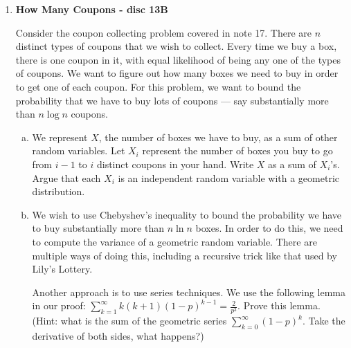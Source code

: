 \documentclass[11pt]{article}
\newif\ifsolutions
\begin{document}
\maketitle



\begin{enumerate}

\item {\bf How Many Coupons - disc 13B}

Consider the coupon collecting problem covered in note 17. There are
$n$ distinct types of coupons that we wish to collect. Every time we
buy a box, there is one coupon in it, with equal likelihood of being
any one of the types of coupons. We want to figure out how many boxes
we need to buy in order to get one of each coupon. For this problem,
we want to bound the probability that we have to buy lots of coupons
--- say substantially more than $n\log{n}$ coupons. 

\begin{enumerate}[a)]
\item We represent $X$, the number of boxes we have to buy, as a sum
  of other random variables. Let $X_i$ represent the number of boxes
  you buy to go from $i-1$ to $i$ distinct coupons in your hand. Write
  $X$ as a sum of $X_i$'s. Argue that each $X_i$ is an independent
  random variable with a geometric distribution. 

\ifsolutions{\color{blue}{
\[ X = \sum\nolimits_{i=1}^n X_i \quad\quad\quad \text{Each  } X_i \sim \text{Geo}\left(\frac{n-i+1}{n}\right) \]
}}\fi

\item We wish to use Chebyshev's inequality to bound the probability
  we have to buy substantially more than $n \ln{n}$ boxes. In order
  to do this, we need to compute the variance of a geometric random
  variable. There are multiple ways of doing this, including a
  recursive trick like that used by Lily's Lottery.

  Another approach is to use series techniques. We use the following
  lemma in our proof: 
  $\sum\nolimits_{k=1}^{\infty} k(k+1)(1-p)^{k-1} =
  \frac{2}{p^3}$. Prove this lemma. (Hint: what is the sum of the
  geometric series $\sum\nolimits_{k=0}^{\infty} (1-p)^k$. Take the
  derivative of both sides, what happens?)

\ifsolutions{\color{blue}{
\begin{align*}
\sum\nolimits_{k=0}^{\infty} (1-p)^k &= \frac{1}{p} &\text{take derivative of both sides twice} \\ 
-\sum\nolimits_{k=0}^{\infty} k(1-p)^{k-1} &= -\frac{1}{p^2}  &\text{1st}\\ 
\sum\nolimits_{k=0}^{\infty} k(k-1)(1-p)^{k-2} &= \frac{2}{p^3} &\text{2nd, LHS $k=0$ term is 0}\\ 
\sum\nolimits_{k=1}^{\infty} k(k-1)(1-p)^{k-2} &= \frac{2}{p^3} \\
\sum\nolimits_{j=0}^{\infty} (j+1)j(1-p)^{j-1} &= \frac{2}{p^3} 
&\text{change summation bounds} j = k-1 \\
\sum\nolimits_{j=1}^{\infty} j(j+1)(1-p)^{j-1} &= \frac{2}{p^3} &\text{LHS $j=0$ term is 0}
\end{align*}
}}\fi



\end{enumerate}
\end{enumerate}
\end{document}
